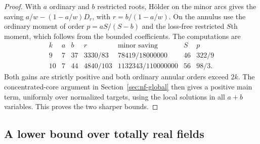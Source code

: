 \documentclass[11pt,letterpaper]{article}
\theoremstyle{definition}
\numberwithin{equation}{section}
\begin{document}
\begin{proof}
With $a$ ordinary and $b$ restricted roots, H\"older on the minor
arcs gives the saving $a/w-(1-a/w)D_r$, with $r=b/(1-a/w)$.
On the annulus use the ordinary moment of order $p=aS/(S-b)$ and
the loss-free restricted $S$th moment, which follows from the
bounded coefficients. The computations are
\[
\begin{array}{c|rr|c|c|r|c}
 k&a&b&r&\text{minor saving}&S&p\\\hline
 9&7&37&3330/83&78419/18000000&46&322/9\\
 10&7&44&4840/103&1132343/110000000&56&98/3 .
\end{array}
\]
Both gains are strictly positive and both ordinary annular orders
exceed $2k$. The concentrated-core argument in
Section~\ref{sec:nf-global} then gives a positive main term, uniformly
over normalized targets, using the local solutions in all $a+b$
variables. This proves the two sharper bounds.
\end{proof}

\subsection{A lower bound over totally real fields}
\end{document}
